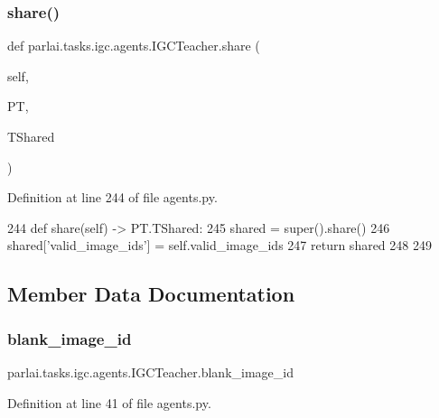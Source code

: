 \subsubsection{\texorpdfstring{share()}{share()}}
{\footnotesize\ttfamily def parlai.\+tasks.\+igc.\+agents.\+I\+G\+C\+Teacher.\+share (\begin{DoxyParamCaption}\item[{}]{self,  }\item[{}]{PT,  }\item[{}]{T\+Shared }\end{DoxyParamCaption})}



Definition at line 244 of file agents.\+py.


\begin{DoxyCode}
244     \textcolor{keyword}{def }share(self) -> PT.TShared:
245         shared = super().share()
246         shared[\textcolor{stringliteral}{'valid\_image\_ids'}] = self.valid\_image\_ids
247         \textcolor{keywordflow}{return} shared
248 
249 
\end{DoxyCode}


\subsection{Member Data Documentation}
\mbox{\label{classparlai_1_1tasks_1_1igc_1_1agents_1_1IGCTeacher_a588193db220eb043d8b2dcb085323a14}} 
\subsubsection{\texorpdfstring{blank\+\_\+image\+\_\+id}{blank\_image\_id}}
{\footnotesize\ttfamily parlai.\+tasks.\+igc.\+agents.\+I\+G\+C\+Teacher.\+blank\+\_\+image\+\_\+id}



Definition at line 41 of file agents.\+py.

\mbox{\label{classparlai_1_1tasks_1_1igc_1_1agents_1_1IGCTeacher_a23adac78cbb7a5761f66fea8809bcee4}} 
